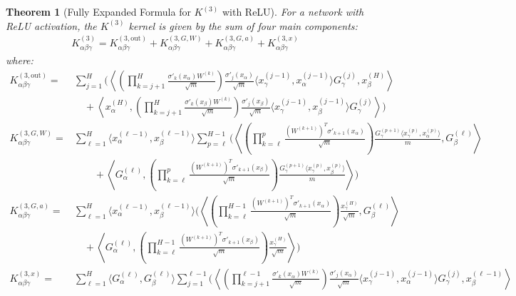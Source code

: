 \documentclass{article}
\newtheorem{theorem}{Theorem}[section]
\begin{document}
\begin{theorem}[Fully Expanded Formula for $K^{(3)}$ with ReLU]
For a network with ReLU activation, the $K^{(3)}$ kernel is given by the sum of four main components:
\begin{align}
K^{(3)}_{\alpha\beta\gamma} = K^{(3,\text{out})}_{\alpha\beta\gamma} + K^{(3,G,W)}_{\alpha\beta\gamma} + K^{(3,G,a)}_{\alpha\beta\gamma} + K^{(3,x)}_{\alpha\beta\gamma}
\end{align}
where:
\begin{align}
K^{(3,\text{out})}_{\alpha\beta\gamma} = & \sum_{j=1}^{H} \Biggl( \left\langle \left( \prod_{k=j+1}^{H} \frac{\sigma'_{k}(x_\alpha) W^{(k)}}{\sqrt{m}} \right) \frac{\sigma'_{j}(x_\alpha)}{\sqrt{m}} \langle x^{(j-1)}_\gamma, x^{(j-1)}_\alpha \rangle G^{(j)}_\gamma, x^{(H)}_\beta \right\rangle \nonumber \\
& \quad + \left\langle x^{(H)}_\alpha, \left( \prod_{k=j+1}^{H} \frac{\sigma'_{k}(x_\beta) W^{(k)}}{\sqrt{m}} \right) \frac{\sigma'_{j}(x_\beta)}{\sqrt{m}} \langle x^{(j-1)}_\gamma, x^{(j-1)}_\beta \rangle G^{(j)}_\gamma \right\rangle \Biggr) \\
K^{(3,G,W)}_{\alpha\beta\gamma} = & \sum_{\ell=1}^{H} \langle x^{(\ell-1)}_\alpha, x^{(\ell-1)}_\beta \rangle \sum_{p=\ell}^{H-1} \Biggl( \left\langle \left( \prod_{k=\ell}^{p} \frac{(W^{(k+1)})^T \sigma'_{k+1}(x_\alpha)}{\sqrt{m}} \right) \frac{G^{(p+1)}_\gamma \langle x^{(p)}_\gamma, x^{(p)}_\alpha \rangle}{m}, G^{(\ell)}_\beta \right\rangle \nonumber \\
& \qquad + \left\langle G^{(\ell)}_\alpha, \left( \prod_{k=\ell}^{p} \frac{(W^{(k+1)})^T \sigma'_{k+1}(x_\beta)}{\sqrt{m}} \right) \frac{G^{(p+1)}_\gamma \langle x^{(p)}_\gamma, x^{(p)}_\beta \rangle}{m} \right\rangle \Biggr) \\
K^{(3,G,a)}_{\alpha\beta\gamma} = & \sum_{\ell=1}^{H} \langle x^{(\ell-1)}_\alpha, x^{(\ell-1)}_\beta \rangle \Biggl( \left\langle \left( \prod_{k=\ell}^{H-1} \frac{(W^{(k+1)})^T \sigma'_{k+1}(x_\alpha)}{\sqrt{m}} \right) \frac{x^{(H)}_\gamma}{\sqrt{m}}, G^{(\ell)}_\beta \right\rangle \nonumber \\
& \quad + \left\langle G^{(\ell)}_\alpha, \left( \prod_{k=\ell}^{H-1} \frac{(W^{(k+1)})^T \sigma'_{k+1}(x_\beta)}{\sqrt{m}} \right) \frac{x^{(H)}_\gamma}{\sqrt{m}} \right\rangle \Biggr) \\
K^{(3,x)}_{\alpha\beta\gamma} = & \sum_{\ell=1}^{H} \langle G^{(\ell)}_\alpha, G^{(\ell)}_\beta \rangle \sum_{j=1}^{\ell-1} \Biggl( \left\langle \left( \prod_{k=j+1}^{\ell-1} \frac{\sigma'_{k}(x_\alpha) W^{(k)}}{\sqrt{m}} \right) \frac{\sigma'_{j}(x_\alpha)}{\sqrt{m}} \langle x^{(j-1)}_\gamma, x^{(j-1)}_\alpha \rangle G^{(j)}_\gamma, x^{(\ell-1)}_\beta \right\rangle \nonumber \\

\end{align}
\end{theorem}
\end{document}
